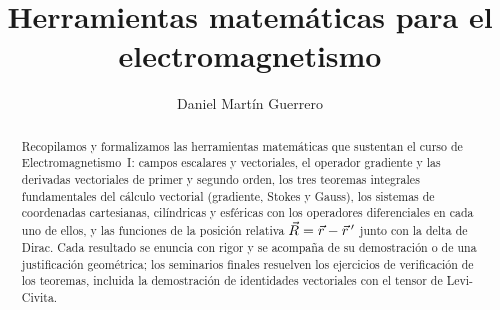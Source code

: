 \documentclass[a4paper,11pt]{amsart}
\title{Herramientas matemáticas para el electromagnetismo}
\author{Daniel Martín Guerrero}
\date{}
\begin{document}

\clearpage
{}
\setcounter{page}{1}

\begin{abstract}
Recopilamos y formalizamos las herramientas matemáticas que sustentan el
curso de Electromagnetismo~I: campos escalares y vectoriales, el operador
gradiente y las derivadas vectoriales de primer y segundo orden, los tres
teoremas integrales fundamentales del cálculo vectorial (gradiente, Stokes
y Gauss), los sistemas de coordenadas cartesianas, cilíndricas y esféricas
con los operadores diferenciales en cada uno de ellos, y las funciones de
la posición relativa $\vec{R}=\vec{r}-\vec{r}\,'$ junto con la delta de Dirac.
Cada resultado se enuncia con rigor y se acompaña de su demostración o de
una justificación geométrica; los seminarios finales resuelven los
ejercicios de verificación de los teoremas, incluida la demostración
de identidades vectoriales con el tensor de Levi-Civita.
\end{abstract}

\maketitle
\tableofcontents










\printbibliography[title={Referencias}]
\end{document}
